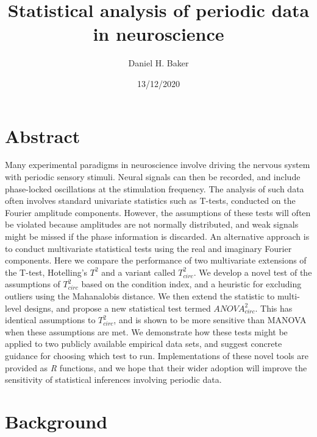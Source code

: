 \documentclass[]{article}
\title{Statistical analysis of periodic data in neuroscience}
\author{Daniel H. Baker}
\date{13/12/2020}
\begin{document}
\maketitle

\hypertarget{abstract}{%
\section{Abstract}\label{abstract}}

Many experimental paradigms in neuroscience involve driving the nervous system with periodic sensory stimuli. Neural signals can then be recorded, and include phase-locked oscillations at the stimulation frequency. The analysis of such data often involves standard univariate statistics such as T-tests, conducted on the Fourier amplitude components. However, the assumptions of these tests will often be violated because amplitudes are not normally distributed, and weak signals might be missed if the phase information is discarded. An alternative approach is to conduct multivariate statistical tests using the real and imaginary Fourier components. Here we compare the performance of two multivariate extensions of the T-test, Hotelling's \(T^2\) and a variant called \(T^2_{circ}\). We develop a novel test of the assumptions of \(T^2_{circ}\) based on the condition index, and a heuristic for excluding outliers using the Mahanalobis distance. We then extend the statistic to multi-level designs, and propose a new statistical test termed \(ANOVA^2_{circ}\). This has identical assumptions to \(T^2_{circ}\), and is shown to be more sensitive than MANOVA when these assumptions are met. We demonstrate how these tests might be applied to two publicly available empirical data sets, and suggest concrete guidance for choosing which test to run. Implementations of these novel tools are provided as \emph{R} functions, and we hope that their wider adoption will improve the sensitivity of statistical inferences involving periodic data.

\hypertarget{background}{%
\section{Background}\label{background}}
\end{document}
